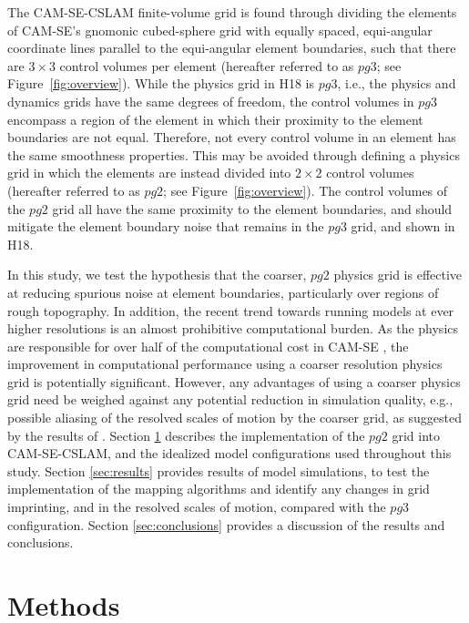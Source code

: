 \documentclass{agujournal}
\begin{document}
The CAM-SE-CSLAM finite-volume grid is found through dividing the elements of CAM-SE's gnomonic cubed-sphere grid with equally spaced, equi-angular coordinate lines parallel to the equi-angular element boundaries, such that there are $3\times 3$ control volumes per element (hereafter referred to as $pg3$; see Figure~\ref{fig:overview}). While the physics grid in H18 is $pg3$, i.e., the physics and dynamics grids have the same degrees of freedom, the control volumes in $pg3$ encompass a region of the element in which their proximity to the element boundaries are not equal. Therefore, not every control volume in an element has the same smoothness properties. This may be avoided through defining a physics grid in which the elements are instead divided into $2\times 2$ control volumes (hereafter referred to as $pg2$; see Figure~\ref{fig:overview}). The control volumes of the $pg2$ grid all have the same proximity to the element boundaries, and should mitigate the element boundary noise that remains in the $pg3$ grid, and shown in H18.

In this study, we test the hypothesis that the coarser, $pg2$ physics grid is effective at reducing spurious noise at element boundaries, particularly over regions of rough topography. In addition, the recent trend towards running models at ever higher resolutions is an almost prohibitive computational burden. As the physics are responsible for over half of the computational cost in CAM-SE \citep{LetAl2018JAMES}, the improvement in computational performance using a coarser resolution physics grid is potentially significant. However, any advantages of using a coarser physics grid need be weighed against any potential reduction in simulation quality, e.g., possible aliasing of the resolved scales of motion by the coarser grid, as suggested by the results of \cite{W1999T}. Section \ref{sec:methods} describes the implementation of the $pg2$ grid into CAM-SE-CSLAM, and the idealized model configurations used throughout this study. Section \ref{sec:results} provides results of model simulations, to test the implementation of the mapping algorithms and identify any changes in grid imprinting, and in the resolved scales of motion, compared with the $pg3$ configuration. Section \ref{sec:conclusions} provides a discussion of the results and conclusions.

\section{Methods}\label{sec:methods}
\end{document}
